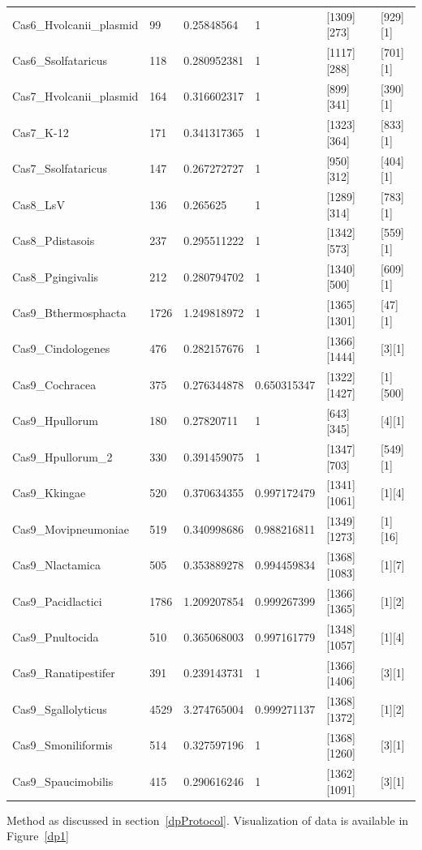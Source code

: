 \documentclass[11pt, oneside]{article}
\begin{document}
\begin{minipage}{\linewidth}
\begin{tabular}{ p{1.25in} C{.85in} *4{C{.75in}}}
Cas6\_Hvolcanii\_plasmid & 99 & 0.25848564 & 1 & [1309][273] & [929][1]\\ 
Cas6\_Ssolfataricus & 118 & 0.280952381 & 1 & [1117][288] & [701][1]\\ 
Cas7\_Hvolcanii\_plasmid & 164 & 0.316602317 & 1 & [899][341] & [390][1]\\ 
Cas7\_K-12 & 171 & 0.341317365 & 1 & [1323][364] & [833][1]\\ 
Cas7\_Ssolfataricus & 147 & 0.267272727 & 1 & [950][312] & [404][1]\\ 
Cas8\_LsV & 136 & 0.265625 & 1 & [1289][314] & [783][1]\\ 
Cas8\_Pdistasois & 237 & 0.295511222 & 1 & [1342][573] & [559][1]\\ 
Cas8\_Pgingivalis & 212 & 0.280794702 & 1 & [1340][500] & [609][1]\\ 
Cas9\_Bthermosphacta & 1726 & 1.249818972 & 1 & [1365][1301] & [47][1]\\ 
Cas9\_Cindologenes & 476 & 0.282157676 & 1 & [1366][1444] & [3][1]\\ 
Cas9\_Cochracea & 375 & 0.276344878 & 0.650315347 & [1322][1427] & [1][500]\\ 
Cas9\_Hpullorum & 180 & 0.27820711 & 1 & [643][345] & [4][1]\\ 
Cas9\_Hpullorum\_2 & 330 & 0.391459075 & 1 & [1347][703] & [549][1]\\ 
Cas9\_Kkingae & 520 & 0.370634355 & 0.997172479 & [1341][1061] & [1][4]\\ 
Cas9\_Movipneumoniae & 519 & 0.340998686 & 0.988216811 & [1349][1273] & [1][16]\\ 
Cas9\_Nlactamica & 505 & 0.353889278 & 0.994459834 & [1368][1083] & [1][7]\\ 
Cas9\_Pacidlactici & 1786 & 1.209207854 & 0.999267399 & [1366][1365] & [1][2]\\ 
Cas9\_Pnultocida & 510 & 0.365068003 & 0.997161779 & [1348][1057] & [1][4]\\ 
Cas9\_Ranatipestifer & 391 & 0.239143731 & 1 & [1366][1406] & [3][1]\\ 
Cas9\_Sgallolyticus & 4529 & 3.274765004 & 0.999271137 & [1368][1372] & [1][2]\\ 
Cas9\_Smoniliformis & 514 & 0.327597196 & 1 & [1368][1260] & [3][1]\\ 
Cas9\_Spaucimobilis & 415 & 0.290616246 & 1 & [1362][1091] & [3][1]\\
\bottomrule[1.25pt]
\end {tabular}\par
\bigskip
Method as discussed in section~\ref{dpProtocol}. Visualization of data is available in Figure~\ref{dp1}
\end{minipage}
\end{document}

